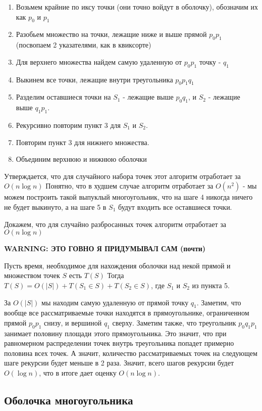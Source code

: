 \documentclass[11pt]{article}
\begin{document}
\begin{enumerate}
\item Возьмем крайние по иксу точки (они точно войдут в оболочку), обозначим их как \(p_0\) и \(p_1\)
\item Разобьем множество на точки, лежащие ниже и выше прямой \(p_0 p_1\) (посвопаем 2 указателями, как в квиксорте)
\item Для верхнего множества найдем самую удаленную от \(p_0 p_1\) точку - \(q_1\)
\item Выкинем все точки, лежащие внутри треугольника \(p_0 p_1 q_1\)
\item Разделим оставшиеся точки на \(S_1\) - лежащие выше \(p_0 q_1\), и \(S_2\) - лежащие выше \(q_1 p_1\).
\item Рекурсивно повторим пункт 3 для \(S_1\) и \(S_2\).
\item Повторим пункт 3 для нижнего множества.
\item Объединим верхнюю и нижнюю оболочки
\end{enumerate}

Утверждается, что для случайного набора точек этот алгоритм отработает за \(O(n \log n)\)
Понятно, что в худшем случае алгоритм отработает за \(O(n^2)\) - мы можем построить такой
выпуклый многоугольник, что на шаге 4 никогда ничего не будет выкинуто, а на шаге 5
в \(S_1\) будут входить все оставшиеся точки.

Докажем, что для случайно разбросанных точек алгоритм отработает за \(O(n \log n)\)

\textbf{WARNING: ЭТО ГОВНО Я ПРИДУМЫВАЛ САМ (почти)}

Пусть время, необходимое для нахождения оболочки над некой прямой и множеством точек
\(S\) есть \(T(S)\)
Тогда \(T(S) = O(|S|) + T(S_1 \in S) + T(S_2 \in S)\), где \(S_1\) и \(S_2\) из пункта 5.

За \(O(|S|)\) мы находим самую удаленную от прямой точку \(q_1\). Заметим, что вообще все рассматриваемые точки
находятся в прямоугольнике, ограниченном прямой \(p_0 p_1\) снизу, и вершиной \(q_1\) сверху.
Заметим также, что треугольник \(p_0 q_1 p_1\) занимает половину площади этого прямоугольника.
Это значит, что при равномерном распределении точек внутрь треугольника попадет примерно половина всех точек.
А значит, количество рассматриваемых точек на следующем шаге рекурсии будет меньше в 2 раза.
Значит, всего шагов рекурсии будет \(O(\log n)\), что в итоге дает оценку \(O(n \log n)\).

\subsection{{\bfseries{}} Оболочка многоугольника}
\label{sec:orgheadline27}
\end{document}
